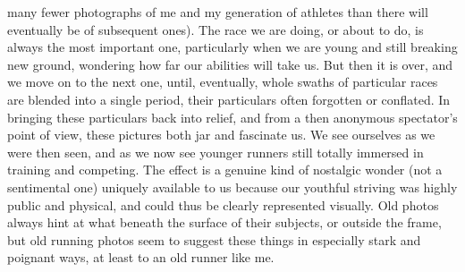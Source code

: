 many fewer photographs of me and my generation of athletes than there will eventually be of subsequent ones). The race we are doing, or about to do, is always the most important one, particularly when we are young and still breaking new ground, wondering how far our abilities will take us. But then it is over, and we move on to the next one, until, eventually, whole swaths of particular races are blended into a single period, their particulars often forgotten or conflated. In bringing these particulars back into relief, and from a then anonymous spectator's point of view, these pictures both jar and fascinate us. We see ourselves as we were then seen, and as we now see younger runners still totally immersed in training and competing. The effect is a genuine kind of nostalgic wonder (not a sentimental one) uniquely available to us because our youthful striving was highly public and physical, and could thus be clearly represented visually. Old photos always hint at what beneath the surface of their subjects, or outside the frame, but old running photos seem to suggest these things in especially stark and poignant ways, at least to an old runner like me.




